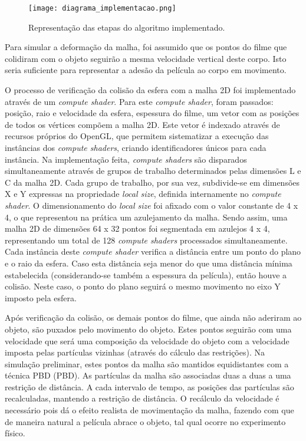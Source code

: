 \begin{figure}
\begin{center} 
\texttt{[image: diagrama\_implementacao.png]}
\caption{Representação das etapas do algoritmo implementado.}
\label{fig:diagrama_implementacao}
\end{center} 
\end{figure}

Para simular a deformação da malha, foi assumido que os pontos do filme que colidiram com o objeto seguirão a mesma velocidade vertical deste corpo. Isto seria suficiente para representar a adesão da película ao corpo em movimento. 

O processo de verificação da colisão da esfera com a malha 2D foi implementado através de um \textit{compute shader}. Para este \textit{compute shader}, foram passados: posição, raio e velocidade da esfera, espessura do filme, um vetor com as posições de todos os vértices compõem a malha 2D. Este vetor é indexado através de recursos próprios do OpenGL, que permitem sistematizar a execução das instâncias dos \textit{compute shaders}, criando identificadores únicos para cada instância. Na implementação feita, \textit{compute shaders} são disparados simultaneamente através de grupos de trabalho determinados pelas dimensões L e C da malha 2D. Cada grupo de trabalho, por sua vez, subdivide-se em dimensões X e Y expressas na propriedade \textit{local size}, definida internamente no \textit{compute shader}. O dimensionamento do \textit{local size} foi afixado com o valor constante de 4 x 4, o que representou na prática um azulejamento da malha. Sendo assim, uma malha 2D de dimensões 64 x 32 pontos foi segmentada em azulejos 4 x 4, representando um total de 128 \textit{compute shaders} processados simultaneamente. Cada instância deste \textit{compute shader} verifica a distância entre um ponto do plano e o raio da esfera. Caso esta distância seja menor do que uma distância mínima estabelecida (considerando-se também a espessura da película), então houve a colisão. Neste caso, o ponto do plano seguirá o mesmo movimento no eixo Y imposto pela esfera. 

Após verificação da colisão, os demais pontos do filme, que ainda não aderiram ao objeto, são puxados pelo movimento do objeto. Estes pontos seguirão com uma velocidade que será uma composição da velocidade do objeto com a velocidade imposta pelas partículas vizinhas (através do cálculo das restrições). Na simulação preliminar, estes pontos da malha são mantidos equidistantes com a técnica \acs{PBD} (\acl{PBD}). As partículas da malha são associadas duas a duas a uma restrição de distância. A cada intervalo de tempo, as posições das partículas são recalculadas, mantendo a restrição de distância. O recálculo da velocidade é necessário pois dá o efeito realista de movimentação da malha, fazendo com que de maneira natural a película abrace o objeto, tal qual ocorre no experimento físico.


